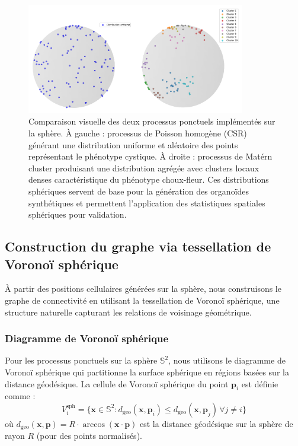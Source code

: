 \begin{figure}[htbp]
    \centering
    \includegraphics[width=0.85\textwidth]{../img/distrib2.png}
    \caption{Comparaison visuelle des deux processus ponctuels implémentés sur la sphère. À gauche : processus de Poisson homogène (CSR) générant une distribution uniforme et aléatoire des points représentant le phénotype cystique. À droite : processus de Matérn cluster produisant une distribution agrégée avec clusters locaux denses caractéristique du phénotype choux-fleur. Ces distributions sphériques servent de base pour la génération des organoïdes synthétiques et permettent l'application des statistiques spatiales sphériques pour validation.}
    \label{fig:distrib2}
\end{figure}

\subsection{Construction du graphe via tessellation de Voronoï sphérique}

À partir des positions cellulaires générées sur la sphère, nous construisons le graphe de connectivité en utilisant la tessellation de Voronoï sphérique, une structure naturelle capturant les relations de voisinage géométrique.

\subsubsection{Diagramme de Voronoï sphérique}

Pour les processus ponctuels sur la sphère $\mathbb{S}^2$, nous utilisons le diagramme de Voronoï sphérique qui partitionne la surface sphérique en régions basées sur la distance géodésique. La cellule de Voronoï sphérique du point $\mathbf{p}_i$ est définie comme :
\[
V_i^{\text{sph}} = \{\mathbf{x} \in \mathbb{S}^2 : d_{\text{geo}}(\mathbf{x}, \mathbf{p}_i) \leq d_{\text{geo}}(\mathbf{x}, \mathbf{p}_j) \, \forall j \neq i\}
\]
où $d_{\text{geo}}(\mathbf{x}, \mathbf{p}) = R \cdot \arccos(\mathbf{x} \cdot \mathbf{p})$ est la distance géodésique sur la sphère de rayon $R$ (pour des points normalisés).

